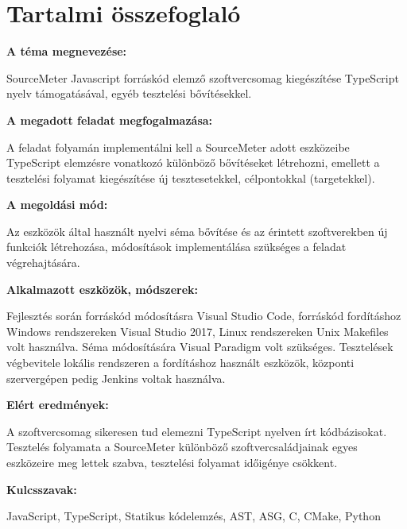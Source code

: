\chapter*{Tartalmi összefoglaló}

\noindent\textbf{A téma megnevezése:}

\noindent SourceMeter Javascript forráskód elemző szoftvercsomag kiegészítése TypeScript nyelv támogatásával, egyéb tesztelési bővítésekkel.

\noindent\textbf{A megadott feladat megfogalmazása:}

\noindent A feladat folyamán implementálni kell a SourceMeter adott eszközeibe TypeScript elemzésre vonatkozó különböző bővítéseket létrehozni, emellett a tesztelési folyamat kiegészítése új tesztesetekkel, célpontokkal (targetekkel).

\noindent\textbf{A megoldási mód:}

\noindent Az eszközök által használt nyelvi séma bővítése és az érintett szoftverekben új funkciók létrehozása, módosítások implementálása szükséges a feladat végrehajtására.

\noindent\textbf{Alkalmazott eszközök, módszerek:}

\noindent Fejlesztés során forráskód módosításra Visual Studio Code, forráskód fordításhoz Windows rendszereken Visual Studio 2017, Linux rendszereken Unix Makefiles volt használva. Séma módosítására Visual Paradigm volt szükséges. Tesztelések végbevitele lokális rendszeren a fordításhoz használt eszközök, központi szervergépen pedig Jenkins voltak használva.

\noindent\textbf{Elért eredmények:}

\noindent A szoftvercsomag sikeresen tud elemezni TypeScript nyelven írt kódbázisokat. Tesztelés folyamata a SourceMeter különböző szoftvercsaládjainak egyes eszközeire meg lettek szabva, tesztelési folyamat időigénye csökkent.

\noindent\textbf{Kulcsszavak:}

\noindent JavaScript, TypeScript, Statikus kódelemzés, AST, ASG, C, CMake, Python
